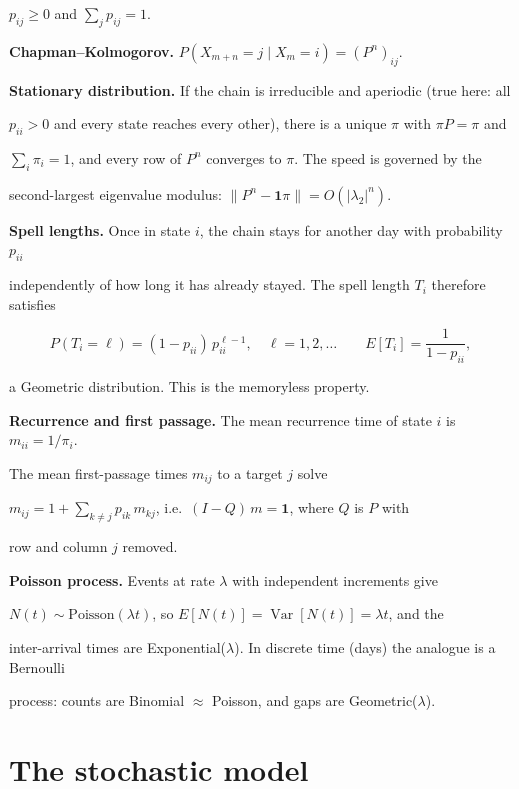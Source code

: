 \documentclass[11pt,a4paper]{article}
\begin{document}
\(p_{ij}\ge 0\) and \(\sum_j p_{ij}=1\).



\textbf{Chapman--Kolmogorov.} \(P(X_{m+n}=j\mid X_m=i) = (P^n)_{ij}\).



\textbf{Stationary distribution.} If the chain is irreducible and aperiodic (true here: all

\(p_{ii}>0\) and every state reaches every other), there is a unique \(\pi\) with \(\pi P = \pi\) and

\(\sum_i\pi_i=1\), and every row of \(P^n\) converges to \(\pi\). The speed is governed by the

second-largest eigenvalue modulus: \(\lVert P^n-\mathbf 1\pi\rVert = O(|\lambda_2|^n)\).



\textbf{Spell lengths.} Once in state \(i\), the chain stays for another day with probability \(p_{ii}\)

independently of how long it has already stayed. The spell length \(T_i\) therefore satisfies

\[P(T_i=\ell) = (1-p_{ii})\,p_{ii}^{\ell-1},\quad \ell=1,2,\dots \qquad E[T_i]=\frac{1}{1-p_{ii}},\]

a Geometric distribution. This is the memoryless property.



\textbf{Recurrence and first passage.} The mean recurrence time of state \(i\) is \(m_{ii}=1/\pi_i\).

The mean first-passage times \(m_{ij}\) to a target \(j\) solve

\(m_{ij} = 1 + \sum_{k\neq j} p_{ik}\, m_{kj}\), i.e.~\((I-Q)\,m = \mathbf 1\), where \(Q\) is \(P\) with

row and column \(j\) removed.



\textbf{Poisson process.} Events at rate \(\lambda\) with independent increments give

\(N(t)\sim\text{Poisson}(\lambda t)\), so \(E[N(t)]=\operatorname{Var}[N(t)]=\lambda t\), and the

inter-arrival times are Exponential(\(\lambda\)). In discrete time (days) the analogue is a Bernoulli

process: counts are Binomial $\approx$ Poisson, and gaps are Geometric(\(\lambda\)).



\section{The stochastic model}\label{the-stochastic-model}
\end{document}
